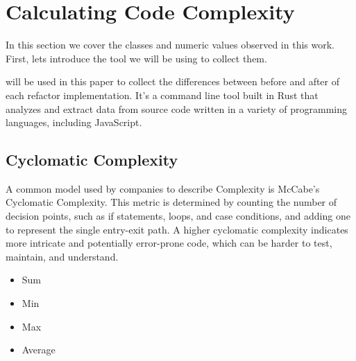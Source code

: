 \section{Calculating Code Complexity}

In this section we cover the classes and numeric values observed in this work.
First, lets introduce the tool we will be using to collect them.

\cite{article:mozilla} will be used in this paper to collect the differences between
before and after of each refactor implementation. It's a command line tool built in Rust that analyzes and extract data
from source code written in a variety of programming languages, including JavaScript.

\subsection{Cyclomatic Complexity}

A common model used by companies to describe Complexity is McCabe's Cyclomatic Complexity.
This metric is determined by counting the number of decision points, such as if statements,
loops, and case conditions, and adding one to represent the single entry-exit path.
A higher cyclomatic complexity indicates more intricate and potentially error-prone code,
which can be harder to test, maintain, and understand.

\begin{itemize}
  \item Sum 
  \item Min 
  \item Max 
  \item Average 
\end{itemize}


